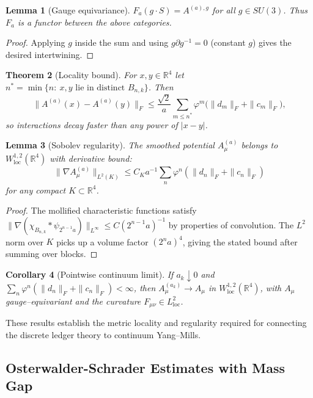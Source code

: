 \documentclass[11pt]{article}
\numberwithin{equation}{section}
\newtheorem{theorem}{Theorem}[section]
\newtheorem{lemma}[theorem]{Lemma}
\newtheorem{corollary}[theorem]{Corollary}
\theoremstyle{definition}
\theoremstyle{remark}
\begin{document}
\begin{lemma}[Gauge equivariance]\label{lem:functor-equiv}
$F_a(g\!\cdot\!S)=A^{(a),g}$ for all $g\in SU(3)$. Thus $F_a$ is a functor between the above categories.
\end{lemma}

\begin{proof}
Applying $g$ inside the sum and using $g\partial g^{-1}=0$ (constant $g$) gives the desired intertwining.
\end{proof}

\begin{theorem}[Locality bound]\label{thm:locality-bound}
For $x,y\in\mathbb R^4$ let $n^*=\min\{n:\ x,y \text{ lie in distinct } B_{n,k}\}$. Then
\[
\|A^{(a)}(x)-A^{(a)}(y)\|_F\le\frac{\sqrt2}{a}\sum_{m\le n^*}\varphi^{m}\bigl(\|d_m\|_F+\|c_m\|_F\bigr),
\]
so interactions decay faster than any power of $|x-y|$.
\end{theorem}

\begin{lemma}[Sobolev regularity]
\label{lem:sobolev-reg}
The smoothed potential $A^{(a)}_\mu$ belongs to $W^{1,2}_{\text{loc}}(\mathbb{R}^4)$ with derivative bound:
\begin{equation}
\|\nabla A^{(a)}_\mu\|_{L^2(K)} \leq C_K a^{-1} \sum_n \varphi^n (\|d_n\|_F + \|c_n\|_F)
\end{equation}
for any compact $K \subset \mathbb{R}^4$.
\end{lemma}

\begin{proof}
The mollified characteristic functions satisfy $\|\nabla(\chi_{B_{n,k}} * \psi_{2^{n-1}a})\|_{L^\infty} \leq C(2^{n-1}a)^{-1}$ by properties of convolution. The $L^2$ norm over $K$ picks up a volume factor $(2^na)^4$, giving the stated bound after summing over blocks.
\end{proof}

\begin{corollary}[Pointwise continuum limit]\label{cor:pointwise-cont}
If $a_k\downarrow0$ and $\sum_n\varphi^{n}(\|d_n\|_F+\|c_n\|_F)<\infty$, then $A^{(a_k)}_\mu\to A_\mu$ in $W^{1,2}_{\text{loc}}(\mathbb R^4)$, with $A_\mu$ gauge--equivariant and the curvature $F_{\mu\nu} \in L^2_{\text{loc}}$.
\end{corollary}

These results establish the metric locality and regularity required for connecting the discrete ledger theory to continuum Yang--Mills.

\subsection{Osterwalder-Schrader Estimates with Mass Gap}
\label{sec:os-estimates}
\end{document}
